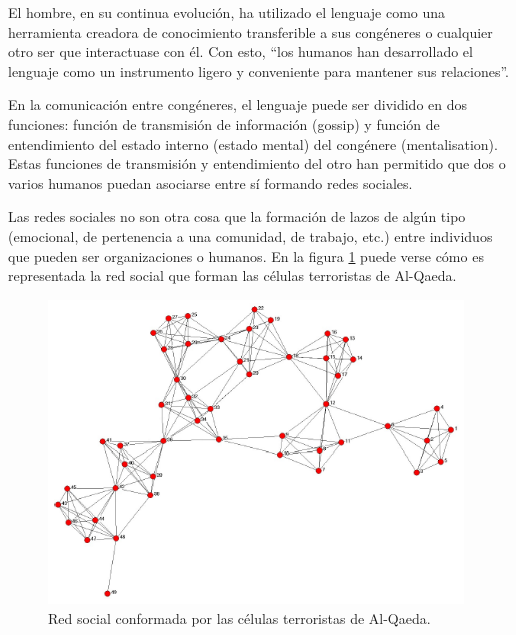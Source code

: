 El hombre, en su continua evolución, ha utilizado el lenguaje como una herramienta creadora de conocimiento transferible a sus congéneres o cualquier otro ser que interactuase con él. Con esto, “los humanos han desarrollado el lenguaje como un instrumento ligero y conveniente para mantener sus relaciones”\cite{dynamics}. 

En la comunicación entre congéneres, el lenguaje puede ser dividido en dos funciones: función de transmisión de información (gossip) y función de entendimiento del estado interno (estado mental) del congénere (mentalisation)\cite{dynamics}. Estas funciones de transmisión y entendimiento del otro han permitido que dos o varios humanos puedan asociarse entre sí formando redes sociales.

Las redes sociales no son otra cosa que la formación de lazos de algún tipo (emocional, de pertenencia a una comunidad, de trabajo, etc.) entre individuos que pueden ser organizaciones o humanos.\cite{sna_startups} En la figura \ref{fig:red_al_quaeda} puede verse cómo es representada la red social que forman las células terroristas de Al-Qaeda.

\begin{figure}[!htb]
  \begin{center}
    \includegraphics[width=11cm]{./imagenes/red_al_qaeda.png}
    \caption{Red social conformada por las células terroristas de Al-Qaeda.}
    \label{fig:red_al_quaeda}
  \end{center}
\end{figure}

